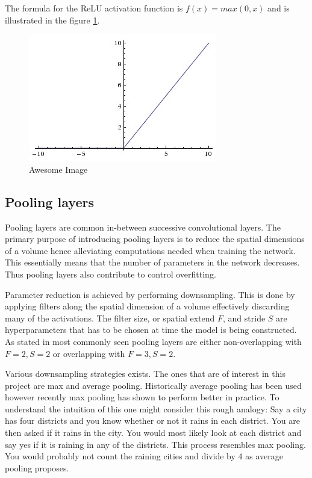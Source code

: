 The formula for the ReLU activation function is $f(x)=max(0,x)$ and is illustrated in the figure \ref{fig:relu}.

\begin{figure}
  \centering
  \includegraphics[scale=0.5]{Img/relu.jpeg}
  \caption{Awesome Image}
  \label{fig:relu}
\end{figure}


\subsection{Pooling layers} %
\label{sub:pool_layers}

Pooling layers are common in-between successive convolutional layers. The primary purpose of introducing pooling layers is to reduce the spatial dimensions of a volume hence alleviating computations needed when training the network. This essentially means that the number of parameters in the network decreases. Thus pooling layers also contribute to control overfitting.

Parameter reduction is achieved by performing downsampling. This is done by applying filters along the spatial dimension of a volume effectively discarding many of the activations. The filter size, or spatial extend $F$, and stride $S$ are hyperparameters that has to be chosen at time the model is being constructed. As stated in \cite{cs231n} most commonly seen pooling layers are either non-overlapping with $F=2, S=2$ or overlapping with $F=3, S=2$.

Various downsampling strategies exists. The ones that are of interest in this project are max and average pooling. Historically average pooling has been used however recently max pooling has shown to perform better in practice. To understand the intuition of this one might consider this rough analogy: Say a city has four districts and you know whether or not it rains in each district. You are then asked if it rains in the city. You would most likely look at each district and say yes if it is raining in any of the districts. This process resembles max pooling. You would probably not count the raining cities and divide by 4 as average pooling proposes. 

